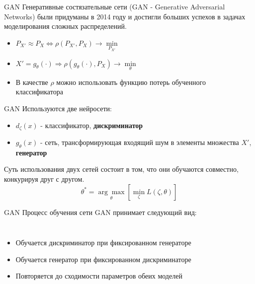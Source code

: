 \documentclass[12pt]{beamer}
\begin{document}
	\begin{frame}{GAN}
		Генеративные состязательные сети (GAN - Generative Adversarial Networks) были придуманы в 2014 году и достигли больших успехов в задачах моделирования сложных распределений.
		\begin{itemize}
			\item $ P_{X'} \approx P_X \Leftrightarrow \rho(P_{X'}, P_X) \longrightarrow \underset{P_{X'}}{\min} $
			\item $ X' = g_{\theta}(\cdot) \Rightarrow \rho(g_{\theta}(\cdot), P_X) \longrightarrow \underset{\theta}{\min}$
			\item В качестве $\rho$ можно использовать функцию потерь обученного классификатора
		\end{itemize}
	\end{frame}
	
	\begin{frame}{GAN}
		Используются две нейросети:
		\begin{itemize}
			\item $d_{\zeta}(x)$ - классификатор, \textbf{дискриминатор}
			\item $g_{\theta}(x)$ - сеть, трансформирующая входящий шум в элементы множества $X'$, \textbf{генератор}
		\end{itemize}
		Суть использования двух сетей состоит в том, что они обучаются совместно, конкурируя друг с другом.
		$$ \theta^* = \underset{\theta}{\arg\max} \left[ \underset{\zeta}{\min} L(\zeta, \theta) \right] $$
	\end{frame}
	
	\begin{frame}{GAN}
		Процесс обучения сети GAN принимает следующий вид:
		\begin{columns}
			\begin{itemize}
				\item Обучается дискриминатор при фиксированном генераторе
				\item Обучается генератор при фиксированном дискриминаторе
				\item Повторяется до сходимости параметров обеих моделей
			\end{itemize}
			\begin{figure}
			\end{figure}
		\end{columns}
	\end{frame}
\end{document}
